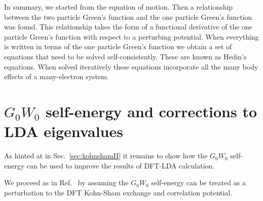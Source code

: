 In summary, we started from the equation of motion. Then a relationship between
the two particle Green's function and the one particle Green's function was found.
This relationship takes the form of a functional derivative of the one particle Green's function with
respect to a perturbing potential. When everything is written in terms 
of the one particle Green's function we obtain a set of equations 
that need to be solved self-consistently. These are known as Hedin's equations. 
When solved iteratively these equations incorporate all the many body 
effects of a many-electron system.

\section{$G_0W_0$ self-energy and corrections to LDA eigenvalues}
\noindent
As hinted at in Sec.~\ref{sec:kohnshamII} it remains to show how the $G_0W_0$ 
self-energy can be used to improve the results of DFT-LDA calculation.

We proceed as in Ref.~\cite{HL86} by assuming the $G_0W_0$
self-energy can be treated as a perturbation to the
DFT Kohn-Sham exchange and correlation potential.

